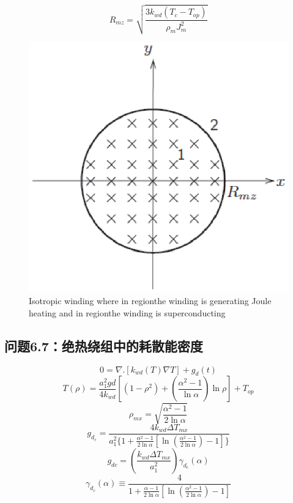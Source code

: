 \begin{equation}%
R_{mz}=\sqrt{\frac{3k_{wd}(T_c-T_{op})}{\rho_mJ_m^2}}
\end{equation}

\begin{figure}[htbp]
	\centering
	\includegraphics[scale=0.7]{chpt6/figs/fig6.21.eps}
	\caption{Isotropic winding where in regionthe winding is generating Joule heating and in regionthe winding is superconducting}
\end{figure}

\subsection{问题6.7：绝热绕组中的耗散能密度}

\begin{equation}%
0=\nabla.[k_{wd}(T)\nabla T]+g_d(t)
\end{equation}
\begin{equation}%
T(\rho)=\frac{a_1^2gd}{4k_{wd}}[(1-\rho^2)+(\frac{\alpha^2-1}{\ln \alpha})\ln\rho]+T_{op}
\end{equation}
\begin{equation}%
\rho_{mx}=\sqrt{\frac{\alpha^2-1}{2\ln \alpha}}
\end{equation}
\begin{equation}%
g_{d_c}=\frac{4k_{wd}\Delta T_{mx}}{a_1^2\{1+\frac{\alpha^2-1}{2\ln \alpha}[\ln{(\frac{\alpha^2-1}{2\ln\alpha})}-1]\}}
\end{equation}
\begin{equation}%
g_{dc}=(\frac{k_{wd}\Delta T_{mx}}{a_1^2})\gamma_{d_c}(\alpha)
\end{equation}
\begin{equation}%
\gamma_{d_c}(\alpha)\equiv\frac{4}{1+\frac{\alpha-1}{2\ln\alpha}[\ln(\frac{\alpha^2-1}{2\ln\alpha})-1]}
\end{equation}


